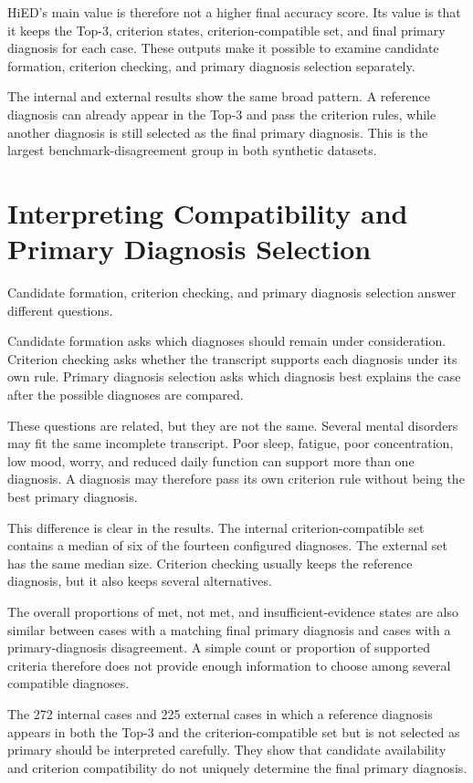\documentclass[12pt,a4paper,oneside]{report}
\begin{document}
HiED's main value is therefore not a higher final accuracy score. Its
value is that it keeps the Top-3, criterion states,
criterion-compatible set, and final primary diagnosis for each case.
These outputs make it possible to examine candidate formation,
criterion checking, and primary diagnosis selection separately.

The internal and external results show the same broad pattern. A
reference diagnosis can already appear in the Top-3 and pass the
criterion rules, while another diagnosis is still selected as the final
primary diagnosis. This is the largest benchmark-disagreement group in
both synthetic datasets.

\section{Interpreting Compatibility and Primary Diagnosis Selection}
\label{sec:discussion-primary-selection}

Candidate formation, criterion checking, and primary diagnosis selection
answer different questions.

Candidate formation asks which diagnoses should remain under
consideration. Criterion checking asks whether the transcript supports
each diagnosis under its own rule. Primary diagnosis selection asks
which diagnosis best explains the case after the possible diagnoses are
compared.

These questions are related, but they are not the same. Several mental
disorders may fit the same incomplete transcript. Poor sleep, fatigue,
poor concentration, low mood, worry, and reduced daily function can
support more than one diagnosis. A diagnosis may therefore pass its own
criterion rule without being the best primary diagnosis.

This difference is clear in the results. The internal
criterion-compatible set contains a median of six of the fourteen
configured diagnoses. The external set has the same median size.
Criterion checking usually keeps the reference diagnosis, but it also
keeps several alternatives.

The overall proportions of met, not met, and insufficient-evidence
states are also similar between cases with a matching final primary
diagnosis and cases with a primary-diagnosis disagreement. A simple count
or proportion of supported criteria therefore does not provide enough
information to choose among several compatible diagnoses.

The 272 internal cases and 225 external cases in which a reference
diagnosis appears in both the Top-3 and the criterion-compatible set but
is not selected as primary should be interpreted carefully. They show
that candidate availability and criterion compatibility do not uniquely
determine the final primary diagnosis.
\end{document}
